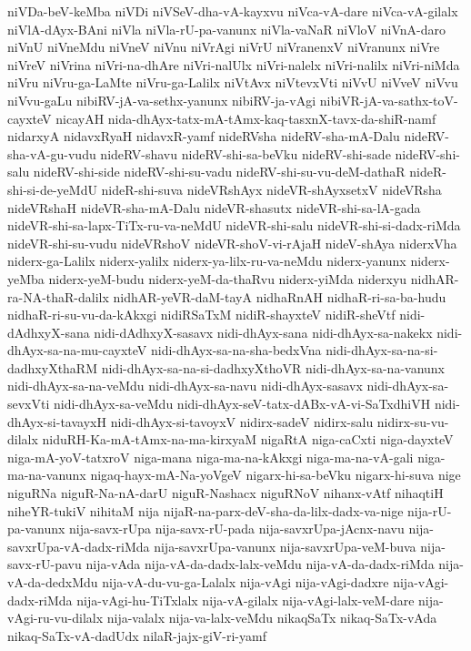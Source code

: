 {niVDa-beV-keMba
niVDi
niVSeV-dha-vA-kayxvu
niVca-vA-dare
niVca-vA-gilalx
niVlA-dAyx-BAni
niVla
niVla-rU-pa-vanunx
niVla-vaNaR
niVloV
niVnA-daro
niVnU
niVneMdu
niVneV
niVnu
niVrAgi
niVrU
niVranenxV
niVranunx
niVre
niVreV
niVrina
niVri-na-dhAre
niVri-nalUlx
niVri-nalelx
niVri-nalilx
niVri-niMda
niVru
niVru-ga-LaMte
niVru-ga-Lalilx
niVtAvx
niVtevxVti
niVvU
niVveV
niVvu
niVvu-gaLu
nibiRV-jA-va-sethx-yanunx
nibiRV-ja-vAgi
nibiVR-jA-va-sathx-toV-cayxteV
nicayAH
nida-dhAyx-tatx-mA-tAmx-kaq-tasxnX-tavx-da-shiR-namf
nidarxyA
nidavxRyaH
nidavxR-yamf
nideRVsha
nideRV-sha-mA-Dalu
nideRV-sha-vA-gu-vudu
nideRV-shavu
nideRV-shi-sa-beVku
nideRV-shi-sade
nideRV-shi-salu
nideRV-shi-side
nideRV-shi-su-vadu
nideRV-shi-su-vu-deM-dathaR
nideR-shi-si-de-yeMdU
nideR-shi-suva
nideVRshAyx
nideVR-shAyxsetxV
nideVRsha
nideVRshaH
nideVR-sha-mA-Dalu
nideVR-shasutx
nideVR-shi-sa-lA-gada
nideVR-shi-sa-lapx-TiTx-ru-va-neMdU
nideVR-shi-salu
nideVR-shi-si-dadx-riMda
nideVR-shi-su-vudu
nideVRshoV
nideVR-shoV-vi-rAjaH
nideV-shAya
niderxVha
niderx-ga-Lalilx
niderx-yalilx
niderx-ya-lilx-ru-va-neMdu
niderx-yanunx
niderx-yeMba
niderx-yeM-budu
niderx-yeM-da-thaRvu
niderx-yiMda
niderxyu
nidhAR-ra-NA-thaR-dalilx
nidhAR-yeVR-daM-tayA
nidhaRnAH
nidhaR-ri-sa-ba-hudu
nidhaR-ri-su-vu-da-kAkxgi
nidiRSaTxM
nidiR-shayxteV
nidiR-sheVtf
nidi-dAdhxyX-sana
nidi-dAdhxyX-sasavx
nidi-dhAyx-sana
nidi-dhAyx-sa-nakekx
nidi-dhAyx-sa-na-mu-cayxteV
nidi-dhAyx-sa-na-sha-bedxVna
nidi-dhAyx-sa-na-si-dadhxyXthaRM
nidi-dhAyx-sa-na-si-dadhxyXthoVR
nidi-dhAyx-sa-na-vanunx
nidi-dhAyx-sa-na-veMdu
nidi-dhAyx-sa-navu
nidi-dhAyx-sasavx
nidi-dhAyx-sa-sevxVti
nidi-dhAyx-sa-veMdu
nidi-dhAyx-seV-tatx-dABx-vA-vi-SaTxdhiVH
nidi-dhAyx-si-tavayxH
nidi-dhAyx-si-tavoyxV
nidirx-sadeV
nidirx-salu
nidirx-su-vu-dilalx
niduRH-Ka-mA-tAmx-na-ma-kirxyaM
nigaRtA
niga-caCxti
niga-dayxteV
niga-mA-yoV-tatxroV
niga-mana
niga-ma-na-kAkxgi
niga-ma-na-vA-gali
niga-ma-na-vanunx
nigaq-hayx-mA-Na-yoVgeV
nigarx-hi-sa-beVku
nigarx-hi-suva
nige
niguRNa
niguR-Na-nA-darU
niguR-Nashacx
niguRNoV
nihanx-vAtf
nihaqtiH
niheYR-tukiV
nihitaM
nija
nijaR-na-parx-deV-sha-da-lilx-dadx-va-nige
nija-rU-pa-vanunx
nija-savx-rUpa
nija-savx-rU-pada
nija-savxrUpa-jAcnx-navu
nija-savxrUpa-vA-dadx-riMda
nija-savxrUpa-vanunx
nija-savxrUpa-veM-buva
nija-savx-rU-pavu
nija-vAda
nija-vA-da-dadx-lalx-veMdu
nija-vA-da-dadx-riMda
nija-vA-da-dedxMdu
nija-vA-du-vu-ga-Lalalx
nija-vAgi
nija-vAgi-dadxre
nija-vAgi-dadx-riMda
nija-vAgi-hu-TiTxlalx
nija-vA-gilalx
nija-vAgi-lalx-veM-dare
nija-vAgi-ru-vu-dilalx
nija-valalx
nija-va-lalx-veMdu
nikaqSaTx
nikaq-SaTx-vAda
nikaq-SaTx-vA-dadUdx
nilaR-jajx-giV-ri-yamf
}
